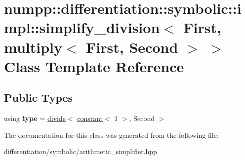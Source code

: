 \hypertarget{classnumpp_1_1differentiation_1_1symbolic_1_1impl_1_1simplify__division_3_01First_00_01multiply_3_01First_00_01Second_01_4_01_4}{}\section{numpp\+:\+:differentiation\+:\+:symbolic\+:\+:impl\+:\+:simplify\+\_\+division$<$ First, multiply$<$ First, Second $>$ $>$ Class Template Reference}
\label{classnumpp_1_1differentiation_1_1symbolic_1_1impl_1_1simplify__division_3_01First_00_01multiply_3_01First_00_01Second_01_4_01_4}
\subsection*{Public Types}
\begin{DoxyCompactItemize}
\item 
\mbox{\label{classnumpp_1_1differentiation_1_1symbolic_1_1impl_1_1simplify__division_3_01First_00_01multiply_3_01First_00_01Second_01_4_01_4_a6777204e59a608a0eab5847b8611ce6d}} 
using {\bfseries type} = \hyperlink{classnumpp_1_1differentiation_1_1symbolic_1_1divide}{divide}$<$ \hyperlink{classnumpp_1_1differentiation_1_1symbolic_1_1constant}{constant}$<$ 1 $>$, Second $>$
\end{DoxyCompactItemize}


The documentation for this class was generated from the following file\+:\begin{DoxyCompactItemize}
\item 
differentiation/symbolic/arithmetic\+\_\+simplifier.\+hpp\end{DoxyCompactItemize}
